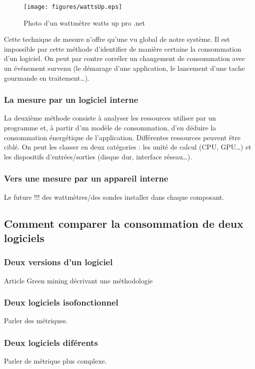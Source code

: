 \documentclass[a4paper, 11pt]{report}
\begin{document}
\begin{figure}
	\begin{center}
		\texttt{[image: figures/wattsUp.eps]}
		\caption{Photo d'un wattmètre watts up pro .net}
		\label{wattsUp}
	\end{center}
\end{figure}

Cette technique de mesure n'offre qu'une vu global de notre système. Il est impossible par cette méthode d'identifier de manière certaine la consommation d'un logiciel. On peut par contre corréler un changement de consommation avec un événement survenu (le démarage d'une application, le lancement d'une tache gourmande en traitement\ldots). 

			\subsubsection{La mesure par un logiciel interne}
La deuxième méthode consiste à analyser les ressources utiliser par un programme et, à partir d'un modèle de consommation, d'en déduire la consommation énergétique de l'application. Différentes ressources peuvent être ciblé. On peut les classer en deux catégories : les unité de calcul (CPU, GPU\ldots) et les dispositifs d'entrées/sorties (disque dur, interface réseau\ldots).



			\subsubsection{Vers une mesure par un appareil interne}
Le future !!! des wattmètres/des sondes installer dans chaque composant.
		
		\subsection{Comment comparer la consommation de deux logiciels}
			\subsubsection{Deux versions d'un logiciel}
Article Green mining\cite{GreenMining} décrivant une méthodologie

			\subsubsection{Deux logiciels isofonctionnel}
Parler des métriques.

			\subsubsection{Deux logiciels diférents}
Parler de métrique plus complexe.
		
\end{document}
